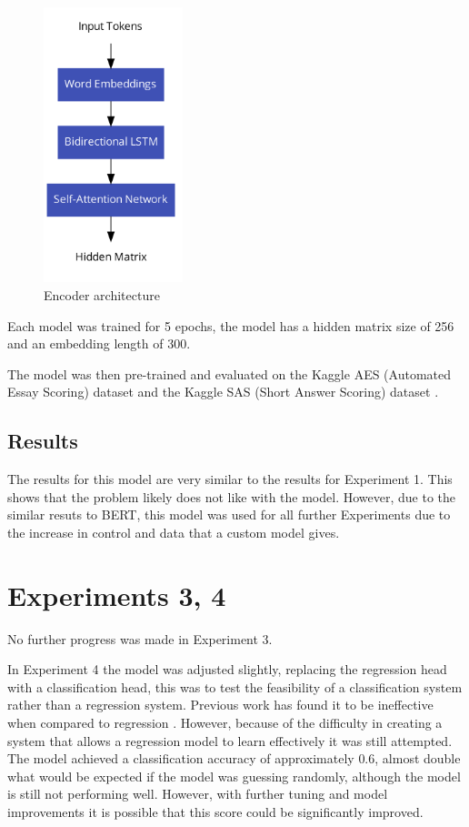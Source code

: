 \documentclass[11pt]{article}
\begin{document}
\begin{figure}[htbp]
\centering
\includegraphics[height=8cm]{../encoder.png}
\caption{Encoder architecture \label{fig:encoder-architecture}}
\end{figure}

Each model was trained for 5 epochs, the model has a hidden matrix size of 256 and an embedding length of 300.

The model was then pre-trained and evaluated on the Kaggle AES (Automated Essay Scoring) dataset \cite{HewlettFoundationAutomated} and the Kaggle SAS (Short Answer Scoring) dataset \cite{HewlettFoundationShort}.


\newpage

\subsection{Results}
\label{sec:orgedb8c05}
The results for this model are very similar to the results for Experiment 1. This shows that the problem likely does not like with the model. However, due to the similar resuts to BERT, this model was used for all further Experiments due to the increase in control and data that a custom model gives.

\section{Experiments 3, 4}
\label{sec:org25fffdf}
No further progress was made in Experiment 3.

In Experiment 4 the model was adjusted slightly, replacing the regression head with a classification head, this was to test the feasibility of a classification system rather than a regression system. Previous work has found it to be ineffective when compared to regression \cite{johanberggrenRegressionClassificationAutomated2019}. However, because of the difficulty in creating a system that allows a regression model to learn effectively it was still attempted. The model achieved a classification accuracy of approximately \(0.6\), almost double what would be expected if the model was guessing randomly, although the model is still not performing well. However, with further tuning and model improvements it is possible that this score could be significantly improved.
\end{document}
